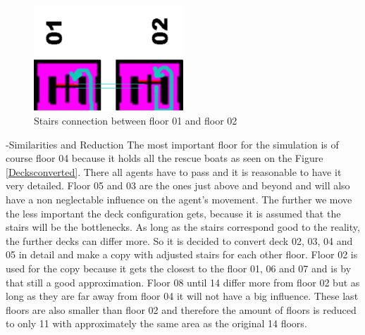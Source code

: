 \documentclass[11pt]{article}
\begin{document}
\begin{figure}[H]
\centering
{\begin{minipage}[t]{7.4cm}
\includegraphics [angle=-90, width=0.5\textwidth]{Decktwostairs.pdf}
\caption{Stairs connection between floor 01 and floor 02}
\label{Decktwostairs}
\end{minipage}}
\end{figure}
-Similarities and Reduction
\newline
The most important floor for the simulation is of course floor 04 because it holds all the rescue boats as seen on the Figure \ref{Decksconverted}. There all agents have to pass and it is reasonable to have it very detailed. Floor 05 and 03 are the ones just above and beyond and will also have a non neglectable influence on the agent’s movement.
\newline
The further we move the less important the deck configuration gets, because it is assumed that the stairs will be the bottlenecks. As long as the stairs correspond good to the reality, the further decks can differ more.
So it is decided to convert deck 02, 03, 04 and 05 in detail and make a copy with adjusted stairs for each other floor. Floor 02 is used for the copy because it gets the closest to the floor 01, 06 and 07 and is by that still a good approximation.
\newline
Floor 08 until 14 differ more from floor 02 but as long as they are far away from floor 04 it will not have a big influence. These last floors are also smaller than floor 02 and therefore the amount of floors is reduced to only 11 with approximately the same area as the original 14 floors.
\end{document}

